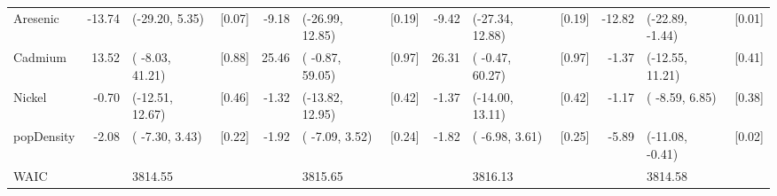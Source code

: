 \documentclass[12,]{article}
\begin{document}
\begin{landscape}
\begin{table}
\begin{tabular}[t]{lrlcrlcrlcrlc}
Aresenic & -13.74 & (-29.20,   5.35) & [0.07] & -9.18 & (-26.99,  12.85) & [0.19] & -9.42 & (-27.34,  12.88) & [0.19] & -12.82 & (-22.89,  -1.44) & [0.01]\\
Cadmium & 13.52 & ( -8.03,  41.21) & [0.88] & 25.46 & ( -0.87,  59.05) & [0.97] & 26.31 & ( -0.47,  60.27) & [0.97] & -1.37 & (-12.55,  11.21) & [0.41]\\
Nickel & -0.70 & (-12.51,  12.67) & [0.46] & -1.32 & (-13.82,  12.95) & [0.42] & -1.37 & (-14.00,  13.11) & [0.42] & -1.17 & ( -8.59,   6.85) & [0.38]\\
popDensity & -2.08 & ( -7.30,   3.43) & [0.22] & -1.92 & ( -7.09,   3.52) & [0.24] & -1.82 & ( -6.98,   3.61) & [0.25] & -5.89 & (-11.08,  -0.41) & [0.02]\\
WAIC &  & 3814.55 &  &  & 3815.65 &  &  & 3816.13 &  &  & 3814.58 & \\
\bottomrule
\end{tabular}
\end{table}
\end{landscape}
\restoregeometry

\printbibliography[title=References]
\end{document}
